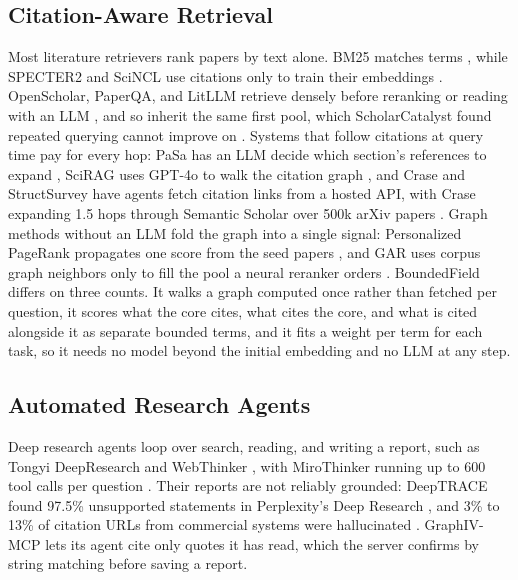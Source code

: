 \subsection{Citation-Aware Retrieval}
Most literature retrievers rank papers by text alone. BM25 matches terms \citep{robertson2009bm25}, while SPECTER2 and SciNCL use citations only to train their embeddings \citep{singh2022scirepeval,ostendorff2022scincl}. OpenScholar, PaperQA, and LitLLM retrieve densely before reranking or reading with an LLM \citep{asai2024openscholar,lala2023paperqa,agarwal2024litllm}, and so inherit the same first pool, which ScholarCatalyst found repeated querying cannot improve on \citep{kim2026scholarcatalyst}. Systems that follow citations at query time pay for every hop: PaSa has an LLM decide which section's references to expand \citep{he2025pasa}, SciRAG uses GPT-4o to walk the citation graph \citep{ding2025scirag}, and Crase and StructSurvey have agents fetch citation links from a hosted API, with Crase expanding 1.5 hops through Semantic Scholar over 500k arXiv papers \citep{hazra2026crase,pedinotti2026structsurvey}. Graph methods without an LLM fold the graph into a single signal: Personalized PageRank propagates one score from the seed papers \citep{page1999pagerank}, and GAR uses corpus graph neighbors only to fill the pool a neural reranker orders \citep{macavaney2022gar}. BoundedField differs on three counts. It walks a graph computed once rather than fetched per question, it scores what the core cites, what cites the core, and what is cited alongside it as separate bounded terms, and it fits a weight per term for each task, so it needs no model beyond the initial embedding and no LLM at any step.

\subsection{Automated Research Agents}
Deep research agents loop over search, reading, and writing a report, such as Tongyi DeepResearch \citep{tongyi2025deepresearch} and WebThinker \citep{li2025webthinker}, with MiroThinker running up to 600 tool calls per question \citep{mirothinker2025}. Their reports are not reliably grounded: DeepTRACE found 97.5\% unsupported statements in Perplexity's Deep Research \citep{venkit2025deeptrace}, and 3\% to 13\% of citation URLs from commercial systems were hallucinated \citep{rao2026hallucinations}. GraphIV-MCP lets its agent cite only quotes it has read, which the server confirms by string matching before saving a report.
